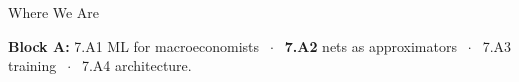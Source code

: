 

\graphicspath{{./figures/}}

\newcommand{\repo}[2]{\href{https://github.com/vonzhg/Macro-2026Fall/blob/main/#1}{\texttt{#2}}}




\makedecktitle

\begin{frame}{Where We Are}
\vspace{-1mm}
\begin{center}
\small \textbf{Block A:} 7.A1 ML for macroeconomists $\;\cdot\;$ \textbf{7.A2} nets as approximators $\;\cdot\;$ 7.A3 training $\;\cdot\;$ 7.A4 architecture.
\end{center}
\end{frame}

